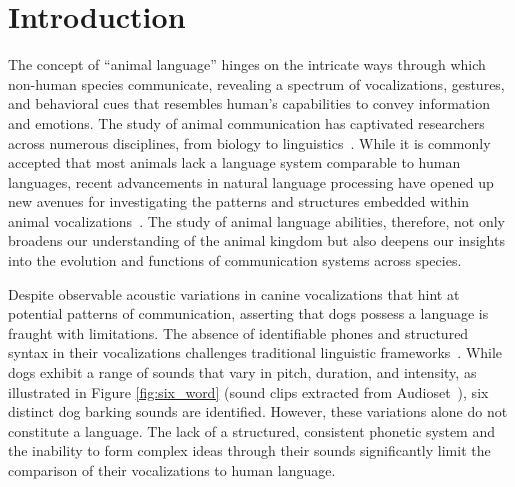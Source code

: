 \section{Introduction}
The concept of ``animal language'' hinges on the intricate ways through which 
non-human species communicate, revealing a spectrum of vocalizations, gestures, 
and behavioral cues that resembles human's capabilities to convey information and emotions. 
The study of animal communication has captivated researchers across numerous disciplines,
from biology to linguistics~\citep{rutz2023using,paladini2020bark,robbins2000vocal,pardo2024african}. 
While it is commonly accepted that most animals lack a language system comparable to 
human languages, recent advancements in natural language processing have opened up 
new avenues for investigating the patterns and structures embedded within animal 
vocalizations~\citep{huang2023transcribing,wang2023towards,sharma2024contextual}. 
The study of animal language abilities, therefore, not only broadens our understanding of the animal kingdom but also deepens our insights into the evolution and functions of communication systems across species.
 
 

Despite observable acoustic variations in canine vocalizations that hint at potential patterns of communication, asserting that dogs possess a language is fraught with limitations. The absence of identifiable phones and structured syntax in their vocalizations challenges traditional linguistic frameworks~\citep{holdcroft1991saussure}. While dogs exhibit a range of sounds that vary in pitch, duration, and intensity, as illustrated in Figure \ref{fig:six_word} (sound clips extracted from Audioset~\citep{gemmeke2017audio}), six distinct dog barking sounds are identified. However,  these variations alone do not constitute a language. The lack of a structured, consistent phonetic system and the inability to form complex ideas through their sounds significantly limit the comparison of their vocalizations to human language.

